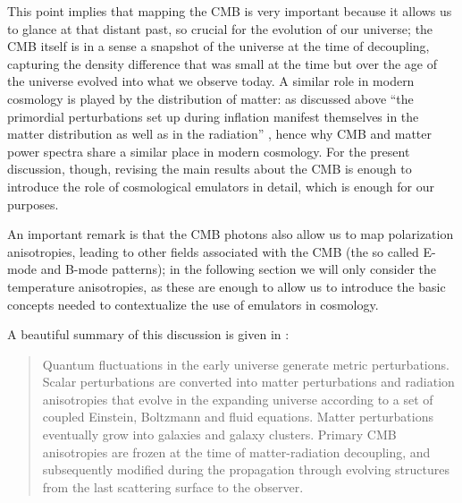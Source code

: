 This point implies that mapping the CMB is very important because it allows us to glance at that distant past, so crucial for the evolution of our universe; the CMB itself is in a sense a snapshot of the universe at the time of decoupling, capturing the density difference that was small at the time but over the age of the universe evolved into what we observe today. 
A similar role in modern cosmology is played by the distribution of matter: as discussed above ``the primordial perturbations set up during inflation manifest themselves in the matter distribution as well as in the radiation'' \cite{modern_cosmology}, hence why CMB and matter power spectra share a similar place in modern cosmology. For the present discussion, though, revising the main results about the CMB is enough to introduce the role of cosmological emulators in detail, which is enough for our purposes.

An important remark is that the CMB photons also allow us to map polarization anisotropies, leading to other fields associated with the CMB (the so called E-mode and B-mode patterns); in the following section we will only consider the temperature anisotropies, as these are enough to allow us to introduce the basic concepts needed to contextualize the use of emulators in cosmology.

A beautiful summary of this discussion is given in \cite{likelihood_cmb}:
\begin{quote}
    Quantum fluctuations in the early universe generate metric perturbations. Scalar perturbations are converted into matter perturbations and radiation anisotropies that evolve in the expanding universe according to a set of coupled Einstein, Boltzmann and fluid equations. Matter perturbations eventually grow into galaxies and galaxy clusters. Primary CMB anisotropies are frozen at the time of matter-radiation decoupling, and subsequently modified during the propagation through evolving structures from the last scattering surface to the observer. 
\end{quote}

